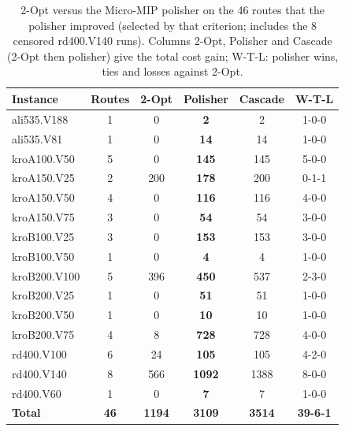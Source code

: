 \begin{table}[t]
\centering
\caption{2-Opt versus the Micro-MIP polisher on the 46 routes that the polisher improved (selected by that criterion; includes the 8 censored rd400.V140 runs). Columns 2-Opt, Polisher and Cascade (2-Opt then polisher) give the total cost gain; W-T-L: polisher wins, ties and losses against 2-Opt.}
\label{tab:two_opt_comparison}
\footnotesize\setlength{\tabcolsep}{4pt}
\begin{tabular}{l c ccc c}
\toprule
\textbf{Instance} & \textbf{Routes} & \textbf{2-Opt} & \textbf{Polisher} & \textbf{Cascade} & \textbf{W-T-L} \\
\midrule
ali535.V188 & 1 & 0 & \textbf{2} & 2 & 1-0-0 \\
ali535.V81 & 1 & 0 & \textbf{14} & 14 & 1-0-0 \\
kroA100.V50 & 5 & 0 & \textbf{145} & 145 & 5-0-0 \\
kroA150.V25 & 2 & 200 & \textbf{178} & 200 & 0-1-1 \\
kroA150.V50 & 4 & 0 & \textbf{116} & 116 & 4-0-0 \\
kroA150.V75 & 3 & 0 & \textbf{54} & 54 & 3-0-0 \\
kroB100.V25 & 3 & 0 & \textbf{153} & 153 & 3-0-0 \\
kroB100.V50 & 1 & 0 & \textbf{4} & 4 & 1-0-0 \\
kroB200.V100 & 5 & 396 & \textbf{450} & 537 & 2-3-0 \\
kroB200.V25 & 1 & 0 & \textbf{51} & 51 & 1-0-0 \\
kroB200.V50 & 1 & 0 & \textbf{10} & 10 & 1-0-0 \\
kroB200.V75 & 4 & 8 & \textbf{728} & 728 & 4-0-0 \\
rd400.V100 & 6 & 24 & \textbf{105} & 105 & 4-2-0 \\
rd400.V140 & 8 & 566 & \textbf{1092} & 1388 & 8-0-0 \\
rd400.V60 & 1 & 0 & \textbf{7} & 7 & 1-0-0 \\
\midrule
\textbf{Total} & \textbf{46} & \textbf{1194} & \textbf{3109} & \textbf{3514} & \textbf{39-6-1} \\
\bottomrule
\end{tabular}
\end{table}
